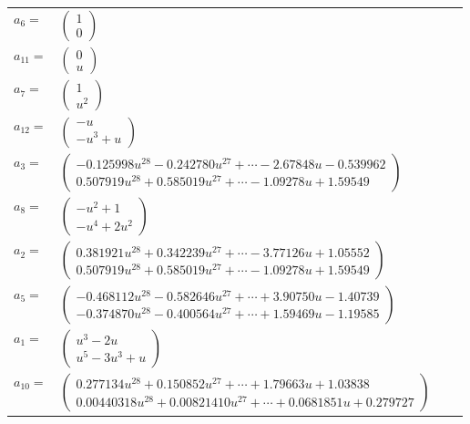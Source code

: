 \documentclass[1p]{elsarticle_modified}
\theoremstyle{definition}
\begin{document}
\begin{tabular}{m{7pt} m{180pt} m{7pt} m{180pt} }
\flushright $a_{6}=$&$\begin{pmatrix}1\\0\end{pmatrix}$ \\
\flushright $a_{11}=$&$\begin{pmatrix}0\\u\end{pmatrix}$ \\
\flushright $a_{7}=$&$\begin{pmatrix}1\\u^2\end{pmatrix}$ \\
\flushright $a_{12}=$&$\begin{pmatrix}- u\\- u^3+u\end{pmatrix}$ \\
\flushright $a_{3}=$&$\begin{pmatrix}-0.125998 u^{28}-0.242780 u^{27}+\cdots-2.67848 u-0.539962\\0.507919 u^{28}+0.585019 u^{27}+\cdots-1.09278 u+1.59549\end{pmatrix}$ \\
\flushright $a_{8}=$&$\begin{pmatrix}- u^2+1\\- u^4+2 u^2\end{pmatrix}$ \\
\flushright $a_{2}=$&$\begin{pmatrix}0.381921 u^{28}+0.342239 u^{27}+\cdots-3.77126 u+1.05552\\0.507919 u^{28}+0.585019 u^{27}+\cdots-1.09278 u+1.59549\end{pmatrix}$ \\
\flushright $a_{5}=$&$\begin{pmatrix}-0.468112 u^{28}-0.582646 u^{27}+\cdots+3.90750 u-1.40739\\-0.374870 u^{28}-0.400564 u^{27}+\cdots+1.59469 u-1.19585\end{pmatrix}$ \\
\flushright $a_{1}=$&$\begin{pmatrix}u^3-2 u\\u^5-3 u^3+u\end{pmatrix}$ \\
\flushright $a_{10}=$&$\begin{pmatrix}0.277134 u^{28}+0.150852 u^{27}+\cdots+1.79663 u+1.03838\\0.00440318 u^{28}+0.00821410 u^{27}+\cdots+0.0681851 u+0.279727\end{pmatrix}$ \\

\end{tabular}
\end{document}
